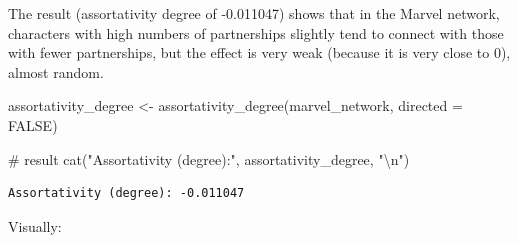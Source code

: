 \documentclass[
  letterpaper,
  DIV=11,
  numbers=noendperiod]{scrartcl}
\newenvironment{Shaded}{\begin{snugshade}}{\end{snugshade}}
\newcommand{\AttributeTok}[1]{\textcolor[rgb]{0.40,0.45,0.13}{#1}}
\newcommand{\CommentTok}[1]{\textcolor[rgb]{0.37,0.37,0.37}{#1}}
\newcommand{\ConstantTok}[1]{\textcolor[rgb]{0.56,0.35,0.01}{#1}}
\newcommand{\DecValTok}[1]{\textcolor[rgb]{0.68,0.00,0.00}{#1}}
\newcommand{\FloatTok}[1]{\textcolor[rgb]{0.68,0.00,0.00}{#1}}
\newcommand{\FunctionTok}[1]{\textcolor[rgb]{0.28,0.35,0.67}{#1}}
\newcommand{\NormalTok}[1]{\textcolor[rgb]{0.00,0.23,0.31}{#1}}
\newcommand{\OtherTok}[1]{\textcolor[rgb]{0.00,0.23,0.31}{#1}}
\newcommand{\SpecialCharTok}[1]{\textcolor[rgb]{0.37,0.37,0.37}{#1}}
\newcommand{\StringTok}[1]{\textcolor[rgb]{0.13,0.47,0.30}{#1}}
\begin{document}
The result (assortativity degree of -0.011047) shows that in the Marvel
network, characters with high numbers of partnerships slightly tend to
connect with those with fewer partnerships, but the effect is very weak
(because it is very close to 0), almost random.

\begin{Shaded}
\begin{Highlighting}[]
\NormalTok{assortativity\_degree }\OtherTok{\textless{}{-}} \FunctionTok{assortativity\_degree}\NormalTok{(marvel\_network, }\AttributeTok{directed =} \ConstantTok{FALSE}\NormalTok{)}

\CommentTok{\# result  }
\FunctionTok{cat}\NormalTok{(}\StringTok{"Assortativity (degree):"}\NormalTok{, assortativity\_degree, }\StringTok{"}\SpecialCharTok{\textbackslash{}n}\StringTok{"}\NormalTok{)}
\end{Highlighting}
\end{Shaded}

\begin{verbatim}
Assortativity (degree): -0.011047 
\end{verbatim}

Visually:

\begin{Shaded}
\end{Shaded}
\end{document}
